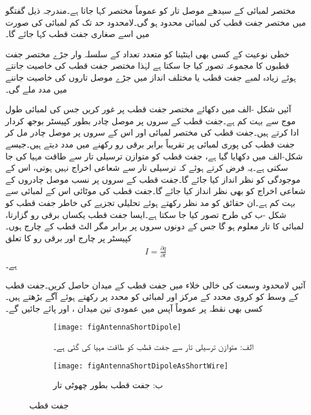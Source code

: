 
مختصر لمبائی کے سیدھے موصل تار کو عموماً مختصر  کہا جاتا ہے۔مندرجہ ذیل گفتگو میں مختصر جفت قطب کی لمبائی محدود ہو گی۔لامحدود حد تک کم لمبائی کی صورت میں اسے صغاری جفت قطب کہا جائے گا۔

خطی نوعیت کے کسی بھی اینٹینا کو متعدد تعداد کے سلسلہ وار جڑے مختصر جفت قطبوں کا مجموعہ تصور کیا جا سکتا ہے لہٰذا مختصر جفت قطب کی خاصیت جانتے ہوئے زیادہ لمبے جفت قطب یا مختلف انداز میں جڑے موصل  تاروں کی خاصیت جاننے میں مدد ملے گی۔ 

آئیں شکل -الف میں دکھائے مختصر جفت قطب پر غور کریں جس کی لمبائی  طول موج سے بہت کم  ہے۔جفت قطب کے سروں پر موصل چادر بطور  کپیسٹر  بوجھ کردار ادا کرتے ہیں۔جفت قطب کی مختصر لمبائی اور اس کے سروں پر موصل چادر مل کر جفت قطب  کی پوری لمبائی پر تقریباً برابر برقی رو رکھنے میں مدد دیتے ہیں۔جیسے شکل-الف میں دکھایا گیا ہے، جفت قطب کو متوازن ترسیلی تار سے طاقت مہیا کی جا سکتی ہے۔یہ فرض کرتے ہوئے کہ ترسیلی تار سے شعاعی اخراج نہیں ہوتی، اس کے موجودگی کو نظر انداز کیا جائے گا۔جفت قطب کے سروں پر نسب موصل چادروں کے شعاعی اخراج کو بھی نظر انداز کیا جائے گا۔جفت قطب کی موٹائی  اس کے لمبائی سے بہت کم  ہے۔ان حقائق کو مد نظر رکھتے ہوئے تحلیلی تجزیے کی خاطر جفت قطب کو شکل -ب کی طرح تصور کیا جا سکتا ہے۔ایسا جفت قطب یکساں برقی رو  گزارتا،  لمبائی کا تار معلوم ہو گا جس کے دونوں سروں پر برابر مگر الٹ قطب کے چارج  ہوں۔کپیسٹر پر چارج  اور برقی رو  کا تعلق
\begin{align}\label{مساوات_اینٹینا_رو_اور_چارج}
I=\frac{\partial q}{\partial t}
\end{align}
ہے۔ 

آئیں لامحدود وسعت کی خالی خلاء میں جفت قطب کے میدان حاصل کریں۔جفت قطب کے وسط کو کروی محدد کے مرکز اور لمبائی کو  محدد پر رکھتے ہوئے آگے بڑھتے ہیں۔کسی بھی نقطہ  پر عموماً آپس میں عمودی تین میدان ،  اور  پائے جائیں گے۔

\begin{figure}
\centering
\begin{subfigure}{0.4\textwidth}
\centering
\texttt{[image: figAntennaShortDipole]}
\caption*{الف: متوازن ترسیلی تار سے جفت قطب کو طاقت مہیا کی گئی ہے۔}
\end{subfigure}%
%
\begin{subfigure}{0.4\textwidth}
\centering
\texttt{[image: figAntennaShortDipoleAsShortWire]}
\caption*{ب: جفت قطب بطور چھوٹی تار}
\end{subfigure}%
\caption{جفت قطب}
\label{شکل_اینٹینا_جفت_قطب}
\end{figure}


